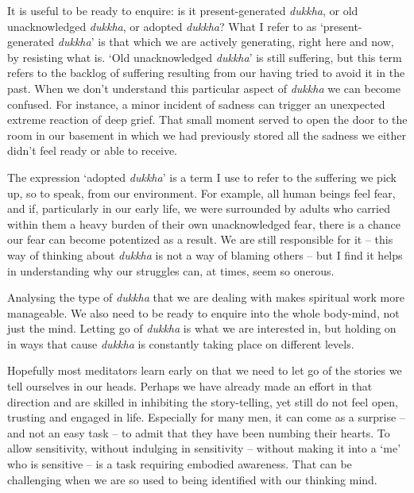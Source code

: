 It is useful to be ready to enquire: is it present-generated
\emph{dukkha}, or old unacknowledged \emph{dukkha}, or adopted
\emph{dukkha}? What I refer to as `present-generated \emph{dukkha}' is
that which we are actively generating, right here and now, by resisting
what is. `Old unacknowledged \emph{dukkha}' is still suffering, but this
term refers to the backlog of suffering resulting from our having tried
to avoid it in the past. When we don't understand this particular aspect
of \emph{dukkha} we can become confused. For instance, a minor incident
of sadness can trigger an unexpected extreme reaction of deep grief.
That small moment served to open the door to the room in our basement in
which we had previously stored all the sadness we either didn't feel
ready or able to receive.

The expression `adopted \emph{dukkha}' is a term I use to refer to the
suffering we pick up, so to speak, from our environment. For example,
all human beings feel fear, and if, particularly in our early life, we
were surrounded by adults who carried within them a heavy burden of
their own unacknowledged fear, there is a chance our fear can become
potentized as a result. We are still responsible for it -- this way of
thinking about \emph{dukkha} is not a way of blaming others -- but I
find it helps in understanding why our struggles can, at times, seem so
onerous.

Analysing the type of \emph{dukkha} that we are dealing with makes
spiritual work more manageable. We also need to be ready to enquire into
the whole body-mind, not just the mind. Letting go of \emph{dukkha} is
what we are interested in, but holding on in ways that cause
\emph{dukkha} is constantly taking place on different levels.

Hopefully most meditators learn early on that we need to let go of the
stories we tell ourselves in our heads. Perhaps we have already made an
effort in that direction and are skilled in inhibiting the
story-telling, yet still do not feel open, trusting and engaged in life.
Especially for many men, it can come as a surprise -- and not an easy
task -- to admit that they have been numbing their hearts. To allow
sensitivity, without indulging in sensitivity -- without making it into
a `me' who is sensitive -- is a task requiring embodied awareness. That
can be challenging when we are so used to being identified with our
thinking mind.

